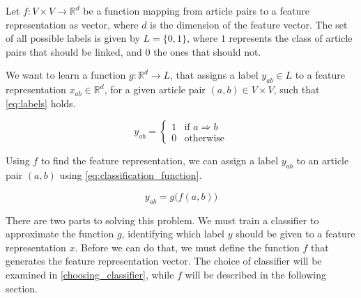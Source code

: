 


Let $f: V\times V \to \mathbb{R}^d$ be a function mapping from article pairs to a feature representation as vector, where $d$ is the dimension of the feature vector. The set of all possible labels is given by $L=\{0,1\}$, where $1$ represents the class of article pairs that should be linked, and $0$ the ones that should not.

We want to learn a function $g: \mathbb{R}^d \to L$, that assigns a label $y_{ab} \in L$ to a feature representation $x_{ab} \in \mathbb{R}^d$, for a given article pair $(a,b) \in V \times V$, such that \cref{eq:labels} holds.

\begin{equation}
\label{eq:labels}
    y_{ab}=
    \begin{cases}
        1 & \text{if } a \Rightarrow b\\
        0 & \text{otherwise}
    \end{cases}
\end{equation}

Using $f$ to find the feature representation, we can assign a label $y_{ab}$ to an article pair $(a,b)$ using \cref{eq:classification_function}.

\begin{equation}
\label{eq:classification_function}
  y_{ab} = g\big(f(a,b)\big)
\end{equation}

There are two parts to solving this problem. We must train a classifier to approximate the function $g$, identifying which label $y$ should be given to a feature representation $x$. Before we can do that, we must define the function $f$ that generates the feature representation vector. The choice of classifier will be examined in \cref{choosing_classifier}, while $f$ will be described in the following section.

